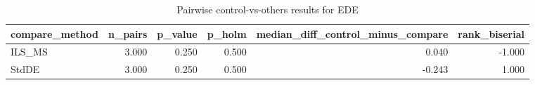 \begin{table}[!t]
\centering
\caption{Pairwise control-vs-others results for EDE}
\label{tab:posthoc_holm_generated}
\begin{tabular}{lrrrrr}
\toprule
compare_method & n_pairs & p_value & p_holm & median_diff_control_minus_compare & rank_biserial \\
\midrule
ILS_MS & 3.000 & 0.250 & 0.500 & 0.040 & -1.000 \\
StdDE & 3.000 & 0.250 & 0.500 & -0.243 & 1.000 \\
\bottomrule
\end{tabular}

\end{table}